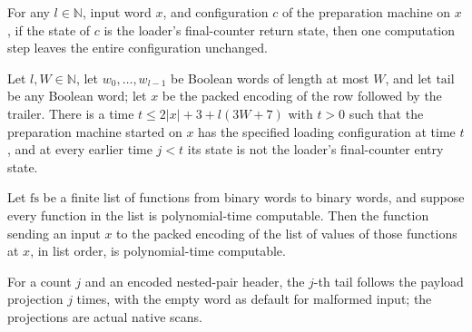 \begin{lemma}
\label{Complexity.clPrepare_idle}
\leanok
{}
For any $l\in\mathbb{N}$, input word $x$, and configuration $c$ of the preparation
machine on $x$, if the state of $c$ is the loader's final-counter return state, then one
computation step leaves the entire configuration unchanged.
\end{lemma}

\begin{lemma}
\label{Complexity.clPrepare_first}
\leanok
{}
Let $l,W\in\mathbb{N}$, let $w_0,\ldots,w_{l-1}$ be Boolean words of length at most $W$,
and let $\mathrm{tail}$ be any Boolean word; let $x$ be the packed encoding of the row
followed by the trailer. There is a time $t\le 2|x|+3+l(3W+7)$ with $t>0$ such that the
preparation machine started on $x$ has the specified loading configuration at time $t$,
and at every earlier time $j<t$ its state is not the loader's final-counter entry state.
\end{lemma}

\begin{lemma}
\label{Complexity.clNative_fields}
\leanok
{}
Let $\mathrm{fs}$ be a finite list of functions from binary words to binary words, and
suppose every function in the list is polynomial-time computable. Then the function
sending an input $x$ to the packed encoding of the list of values of those functions at
$x$, in list order, is polynomial-time computable.
\end{lemma}

\begin{definition}
\label{Complexity.clHeaderTail}
\leanok
{}
For a count $j$ and an encoded nested-pair header, the $j$-th tail follows the payload projection $j$ times, with the empty word as default for malformed input; the projections are actual native scans.
\end{definition}

